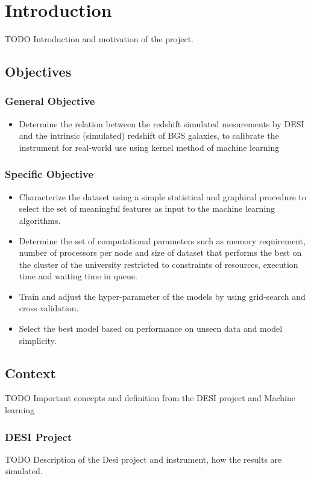 \chapter{Introduction}

TODO Introduction and motivation of the project.

\section{Objectives}

\subsection{General Objective}
\begin{itemize}
	\item Determine the relation between the redshift simulated mesurements by DESI   and the intrinsic (simulated) redshift of BGS galaxies, to calibrate the instrument for real-world use using kernel method of machine learning
\end{itemize}

\subsection{Specific Objective}
\begin{itemize}
	\item Characterize the dataset using a simple statistical and graphical procedure to select the set of meaningful features as input to the machine learning algorithms. 
	\item Determine the set of computational parameters such as memory requirement, number of processors per node and size of dataset that performs the best on the cluster of the university restricted to constraints of resources, execution time and waiting time in queue.
	\item Train and adjust the hyper-parameter of the models by using grid-search and cross validation.
	\item Select the best model based on performance on unseen data and model simplicity.
\end{itemize}

\section{Context}
TODO Important concepts and definition from the DESI project and Machine learning
\subsection{DESI Project}
TODO Description of the Desi project and instrument, how the results are simulated. 
